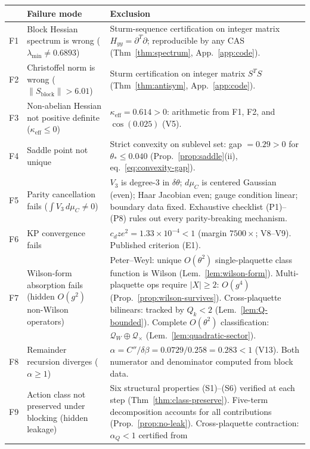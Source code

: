 \documentclass[11pt]{article}
\theoremstyle{definition}
\begin{document}
\begin{center}
\renewcommand{\arraystretch}{1.25}
\begin{tabular}{@{}p{0.4cm}p{5.5cm}p{6.5cm}@{}}
\toprule
& \textbf{Failure mode} & \textbf{Exclusion}\\
\midrule
F1 & Block Hessian spectrum is wrong
($\lambda_{\min}\ne 0.6893$) &
Sturm-sequence certification on integer matrix
$H_{yy}=\partial^T\partial$; reproducible by any CAS
(Thm~\ref{thm:spectrum}, App.~\ref{app:code}).\\
F2 & Christoffel norm is wrong
($\|S_{\mathrm{block}}\|>6.01$) &
Sturm certification on integer matrix $S^TS$
(Thm~\ref{thm:antisym}, App.~\ref{app:code}).\\
F3 & Non-abelian Hessian not positive definite
($\kappa_{\mathrm{eff}}\le 0$) &
$\kappa_{\mathrm{eff}}=0.614>0$: arithmetic from
F1, F2, and $\cos(0.025)$ (V5).\\
F4 & Saddle point not unique &
Strict convexity on sublevel set:
gap $=0.29>0$ for $\theta_*\le 0.040$
(Prop.~\ref{prop:saddle}(ii), eq.~\eqref{eq:convexity-gap}).\\
F5 & Parity cancellation fails
($\int V_3\,d\mu_C\ne 0$) &
$V_3$ is degree-3 in $\delta\theta$; $d\mu_C$ is
centered Gaussian (even); Haar Jacobian even;
gauge condition linear; boundary data fixed.
Exhaustive checklist (P1)--(P8) rules out every
parity-breaking mechanism.\\
F6 & KP convergence fails &
$c_d z e^2=1.33\times 10^{-4}<1$ (margin $7500\times$;
V8--V9). Published criterion (E1).\\
F7 & Wilson-form absorption fails
(hidden $O(g^2)$ non-Wilson operators) &
Peter--Weyl: unique $O(\theta^2)$ single-plaquette class
function is Wilson (Lem.~\ref{lem:wilson-form}).
Multi-plaquette ops require $|X|\ge 2$: $O(g^4)$
(Prop.~\ref{prop:wilson-survives}).
Cross-plaquette bilinears: tracked by $Q_k<2$
(Lem.~\ref{lem:Q-bounded}).
Complete $O(\theta^2)$ classification:
$\mathcal{Q}_W\oplus\mathcal{Q}_\times$
(Lem.~\ref{lem:quadratic-sector}).\\
F8 & Remainder recursion diverges
($\alpha\ge 1$) &
$\alpha=C''/\delta\beta=0.0729/0.258=0.283<1$ (V13).
Both numerator and denominator computed from block data.\\
F9 & Action class not preserved under blocking
(hidden leakage) &
Six structural properties (S1)--(S6) verified at each step
(Thm~\ref{thm:class-preserve}).
Five-term decomposition accounts for all contributions
(Prop.~\ref{prop:no-leak}).
Cross-plaquette contraction: $\alpha_Q<1$ certified from

\end{tabular}
\end{center}
\end{document}
